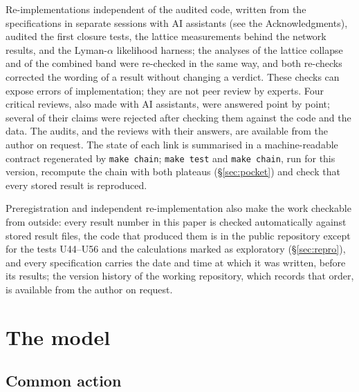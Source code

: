 \documentclass[11pt,a4paper]{article}
\begin{document}
Re-implementations independent of the audited code, written from the specifications in separate sessions with AI assistants (see the Acknowledgments), audited the first closure tests, the lattice measurements behind the network results, and the Lyman-$\alpha$ likelihood harness; the analyses of the lattice collapse and of the combined band were re-checked in the same way, and both re-checks corrected the wording of a result without changing a verdict.
These checks can expose errors of implementation; they are not peer review by experts.
Four critical reviews, also made with AI assistants, were answered point by point; several of their claims were rejected after checking them against the code and the data. The audits, and the reviews with their answers, are available from the author on request.
The state of each link is summarised in a machine-readable contract regenerated by \texttt{make chain}; \texttt{make test} and \texttt{make chain}, run for this version, recompute the chain with both plateaus (\S\ref{sec:pocket}) and check that every stored result is reproduced.

Preregistration and independent re-implementation also make the work checkable from outside: every result number in this paper is checked automatically against stored result files, the code that produced them is in the public repository except for the tests U44--U56 and the calculations marked as exploratory (\S\ref{sec:repro}), and every specification carries the date and time at which it was written, before its results; the version history of the working repository, which records that order, is available from the author on request.

\section{The model}
\label{sec:model}

\subsection{Common action}
\end{document}
